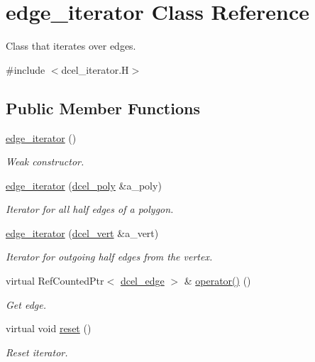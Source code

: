 \hypertarget{classedge__iterator}{}\section{edge\+\_\+iterator Class Reference}
\label{classedge__iterator}


Class that iterates over edges.  




{\ttfamily \#include $<$dcel\+\_\+iterator.\+H$>$}

\subsection*{Public Member Functions}
\begin{DoxyCompactItemize}
\item 
\hyperlink{classedge__iterator_abdf1319ec126ef6801f6cd62971c01d1}{edge\+\_\+iterator} ()
\begin{DoxyCompactList}\small\item\em Weak constructor. \end{DoxyCompactList}\item 
\hyperlink{classedge__iterator_a0f7b047d873e7ff189c8efcad294af32}{edge\+\_\+iterator} (\hyperlink{classdcel__poly}{dcel\+\_\+poly} \&a\+\_\+poly)
\begin{DoxyCompactList}\small\item\em Iterator for all half edges of a polygon. \end{DoxyCompactList}\item 
\hyperlink{classedge__iterator_a2f747f0305720c7ac836d1ed23de34e4}{edge\+\_\+iterator} (\hyperlink{classdcel__vert}{dcel\+\_\+vert} \&a\+\_\+vert)
\begin{DoxyCompactList}\small\item\em Iterator for outgoing half edges from the vertex. \end{DoxyCompactList}\item 
virtual Ref\+Counted\+Ptr$<$ \hyperlink{classdcel__edge}{dcel\+\_\+edge} $>$ \& \hyperlink{classedge__iterator_ae4824b4dcc07bb6921b0ae5631504d1c}{operator()} ()
\begin{DoxyCompactList}\small\item\em Get edge. \end{DoxyCompactList}\item 
virtual void \hyperlink{classedge__iterator_a3482d7ce0e424f0bfd3c925a7a56023d}{reset} ()
\begin{DoxyCompactList}\small\item\em Reset iterator. \end{DoxyCompactList}\item 

\end{DoxyCompactItemize}
